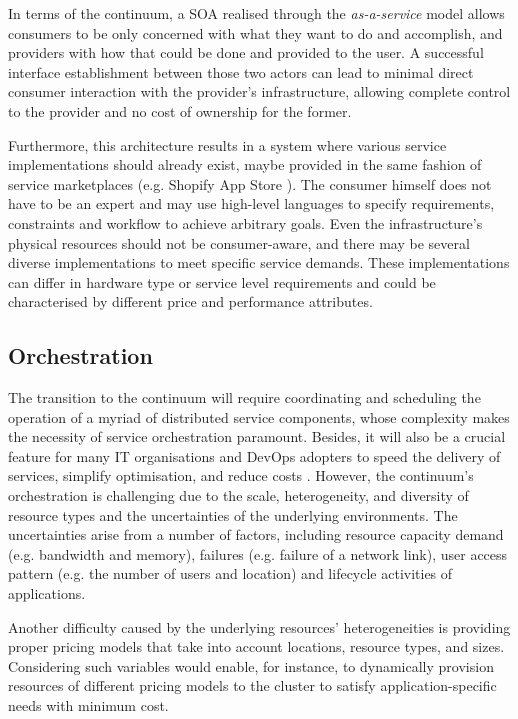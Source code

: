 In terms of the continuum, a SOA realised through the \emph{as-a-service} model allows consumers to be only concerned with what they want to do and accomplish, and providers with how that could be done and provided to the user. A successful interface establishment between those two actors can lead to minimal direct consumer interaction with the provider's infrastructure, allowing complete control to the provider and no cost of ownership for the former.

Furthermore, this architecture results in a system where various service implementations should already exist, maybe provided in the same fashion of service marketplaces (e.g. Shopify App Store \cite{shopify}). The consumer himself does not have to be an expert and may use high-level languages to specify requirements, constraints and workflow to achieve arbitrary goals. Even the infrastructure's physical resources should not be consumer-aware, and there may be several diverse implementations to meet specific service demands. These implementations can differ in hardware type or service level requirements and could be characterised by different price and performance attributes.

\subsection{Orchestration}

The transition to the continuum will require coordinating and scheduling the operation of a myriad of distributed service components, whose complexity makes the necessity of service orchestration paramount. Besides, it will also be a crucial feature for many IT organisations and DevOps adopters to speed the delivery of services, simplify optimisation, and reduce costs \cite{nygren2010akamai}. However, the continuum's orchestration is challenging due to the scale, heterogeneity, and diversity of resource types and the uncertainties of the underlying environments. The uncertainties arise from a number of factors, including resource capacity demand (e.g. bandwidth and memory), failures (e.g. failure of a network link), user access pattern (e.g. the number of users and location) and lifecycle activities of applications.

Another difficulty caused by the underlying resources' heterogeneities is providing proper pricing models that take into account locations, resource types, and sizes. Considering such variables would enable, for instance, to dynamically provision resources of different pricing models to the cluster to satisfy application-specific needs with minimum cost.

